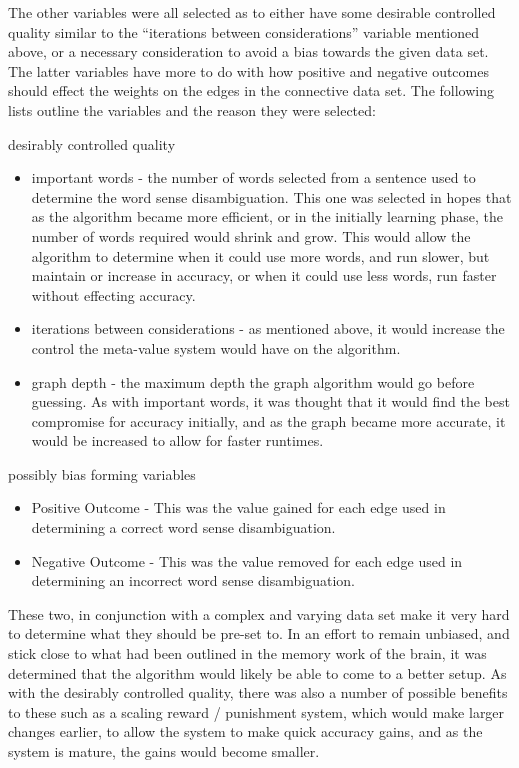 The other variables were all selected as to either have some desirable controlled quality similar to the ``iterations between considerations'' variable mentioned above, or a necessary consideration to avoid a bias towards the given data set.  The latter variables have more to do with how positive and negative outcomes should effect the weights on the edges in the connective data set. The following lists outline the variables and the reason they were selected:

desirably controlled quality
\begin{itemize}
	\item important words - the number of words selected from a sentence used to determine the word sense disambiguation. This one was selected in hopes that as the algorithm became more efficient, or in the initially learning phase, the number of words required would shrink and grow.  This would allow the algorithm to determine when it could use more words, and run slower, but maintain or increase in accuracy, or when it could use less words, run faster without effecting accuracy.
	\item iterations between considerations - as mentioned above, it would increase the control the meta-value system would have on the algorithm.
	\item graph depth - the maximum depth the graph algorithm would go before guessing.  As with important words, it was thought that it would find the best compromise for accuracy initially, and as the graph became more accurate, it would be increased to allow for faster runtimes.
\end{itemize}

possibly bias forming variables
\begin{itemize}
	\item Positive Outcome - This was the value gained for each edge used in determining a correct word sense disambiguation. 
	\item Negative Outcome - This was the value removed for each edge used in determining an incorrect word sense disambiguation.
\end{itemize}

These two, in conjunction with a complex and varying data set make it very hard to determine what they should be pre-set to. In an effort to remain unbiased, and stick close to what had been outlined in the memory work of the brain, it was determined that the algorithm would likely be able to come to a better setup.  As with the desirably controlled quality, there was also a number of possible benefits to these such as a scaling reward / punishment system, which would make larger changes earlier, to allow the system to make quick accuracy gains, and as the system is mature, the gains would become smaller.
